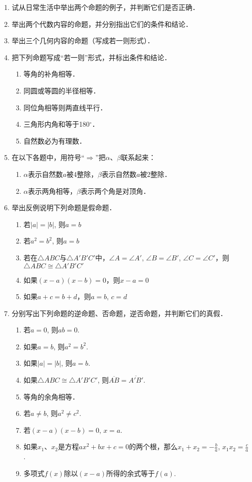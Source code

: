 \begin{ex}
	\begin{enumerate}
		\item 试从日常生活中举出两个命题的例子，并判断它们是否正确．
		\item 举出两个代数内容的命题，并分别指出它们的条件和结论．
		\item 举出三个几何内容的命题（写成若一则形式）．
		\item 把下列命题写成“若一则”形式，并标出条件和结论．
		\begin{enumerate}
			\item 等角的补角相等．
			\item 同圆或等圆的半径相等．
			\item 同位角相等则两直线平行．
			\item 三角形内角和等于180$^{\circ}$．
			\item 自然数必为有理数．
		\end{enumerate}
		\item 在以下各题中，用符号“$\Rightarrow$”把$\alpha$、$\beta$联系起来：
		\begin{enumerate}
			\item $\alpha$表示自然数$a$被4整除，$\beta$表示自然数$a$被2整除．
			\item $\alpha$表示两角相等，$\beta$表示两个角是对顶角．
		\end{enumerate}
		\item 举出反例说明下列命题是假命题．
		\begin{enumerate}
			\item 若$|a|=|b|$, 则$a=b$
			\item 若$a^2=b^2$, 则$a=b$
			\item 若在$\triangle ABC$与$\triangle A'B'C'$中，$\angle A=\angle A'$, $\angle B=\angle B'$, $\angle C=\angle C'$，则$\triangle ABC\cong \triangle A'B'C'$
			\item 如果$(x-a)(x-b)=0$，则$x-a=0$
			\item 如果$a+c=b+d$，则$a=b$, $c=d$
		\end{enumerate}
		\item 分别写出下列命题的逆命题、否命题，逆否命题，并判断它们的真假．
		\begin{enumerate}
			\item 若$a=0$, 则$ab=0$.
			\item 如果$a=b$, 则$a^2=b^2$.
			\item 如果$|a|=|b|$, 则$a=b$.
			\item 如果$\triangle ABC\cong \triangle A'B'C'$, 则$\overline{AB}=\overline{A'B'}$.
			\item 等角的余角相等．
			\item 若$a\ne b$, 则$a^2\ne c^2$.
			\item 若$(x-a)(x-b)=0$, $x=a$.
			\item 如果$x_1$、$x_2$是方程$ax^2+bx+c=0$的两个根，那么$x_1+x_2=-\frac{b}{a}$, $x_1x_2=\frac{c}{a}$.
			\item 多项式$f(x)$除以$(x-a)$所得的余式等于$f(a)$.
		\end{enumerate}
	\end{enumerate}
\end{ex}

